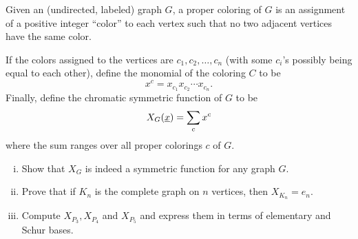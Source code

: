 \documentclass[12pt]{memoir}
\begin{document}
\begin{Ej}[Exercise 6]
    Given an (undirected, labeled) graph $G$, a proper coloring of $G$ is an assignment of a positive integer “color” to each vertex such that no two adjacent vertices have the same color.\par 
    If the colors assigned to the vertices are $c_1, c_2,\dots , c_n$ (with some $c_i$'s possibly being
equal to each other), define the monomial of the coloring $C$ to be 
$$x^c = x_{c_1} x_{c_2}\cdots x_{c_n}.$$  
Finally, define the chromatic symmetric function of $G$ to be
$$X_G(\underline x)=\sum_cx^c$$
where the sum ranges over all proper colorings $c$ of $G$.
\begin{enumerate}[i)]
    \itemsep=-0.4em
    \item Show that $X_G$ is indeed a symmetric function for any graph $G$.
    \item Prove that if $K_n$ is the complete graph on $n$ vertices, then $X_{K_n}=e_n$.
    \item Compute $X_{P_3},X_{P_4}$ and $X_{P_5}$ and express them in terms of elementary and Schur bases.
\end{enumerate}
\end{Ej}
\end{document}

